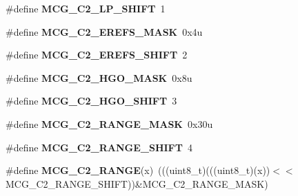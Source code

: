 \begin{DoxyCompactItemize}
\item 
\#define {\bfseries M\+C\+G\+\_\+\+C2\+\_\+\+L\+P\+\_\+\+S\+H\+I\+FT}~1\hypertarget{group__MCG__Register__Masks_ga2c16a5396267a83c2059741d31c3af1a}{}\label{group__MCG__Register__Masks_ga2c16a5396267a83c2059741d31c3af1a}

\item 
\#define {\bfseries M\+C\+G\+\_\+\+C2\+\_\+\+E\+R\+E\+F\+S\+\_\+\+M\+A\+SK}~0x4u\hypertarget{group__MCG__Register__Masks_ga2c7a64bac24e9840a1b38fd20f45ee32}{}\label{group__MCG__Register__Masks_ga2c7a64bac24e9840a1b38fd20f45ee32}

\item 
\#define {\bfseries M\+C\+G\+\_\+\+C2\+\_\+\+E\+R\+E\+F\+S\+\_\+\+S\+H\+I\+FT}~2\hypertarget{group__MCG__Register__Masks_gaf8a3c1b95c6c95b6b86dd47ee3e8df8d}{}\label{group__MCG__Register__Masks_gaf8a3c1b95c6c95b6b86dd47ee3e8df8d}

\item 
\#define {\bfseries M\+C\+G\+\_\+\+C2\+\_\+\+H\+G\+O\+\_\+\+M\+A\+SK}~0x8u\hypertarget{group__MCG__Register__Masks_gaebd354dd4b68914ead6f2604e4aaf6f0}{}\label{group__MCG__Register__Masks_gaebd354dd4b68914ead6f2604e4aaf6f0}

\item 
\#define {\bfseries M\+C\+G\+\_\+\+C2\+\_\+\+H\+G\+O\+\_\+\+S\+H\+I\+FT}~3\hypertarget{group__MCG__Register__Masks_ga803a8ad30224642fcf09f8d738a21e52}{}\label{group__MCG__Register__Masks_ga803a8ad30224642fcf09f8d738a21e52}

\item 
\#define {\bfseries M\+C\+G\+\_\+\+C2\+\_\+\+R\+A\+N\+G\+E\+\_\+\+M\+A\+SK}~0x30u\hypertarget{group__MCG__Register__Masks_ga265bc5e03a60b515a2f554807c106c53}{}\label{group__MCG__Register__Masks_ga265bc5e03a60b515a2f554807c106c53}

\item 
\#define {\bfseries M\+C\+G\+\_\+\+C2\+\_\+\+R\+A\+N\+G\+E\+\_\+\+S\+H\+I\+FT}~4\hypertarget{group__MCG__Register__Masks_ga0198b0ee825233bd73c2681c2072e5d6}{}\label{group__MCG__Register__Masks_ga0198b0ee825233bd73c2681c2072e5d6}

\item 
\#define {\bfseries M\+C\+G\+\_\+\+C2\+\_\+\+R\+A\+N\+GE}(x)~(((uint8\+\_\+t)(((uint8\+\_\+t)(x))$<$$<$M\+C\+G\+\_\+\+C2\+\_\+\+R\+A\+N\+G\+E\+\_\+\+S\+H\+I\+FT))\&M\+C\+G\+\_\+\+C2\+\_\+\+R\+A\+N\+G\+E\+\_\+\+M\+A\+SK)\hypertarget{group__MCG__Register__Masks_gaaca8c6b60b8c40403204e606565281d2}{}\label{group__MCG__Register__Masks_gaaca8c6b60b8c40403204e606565281d2}


\end{DoxyCompactItemize}
